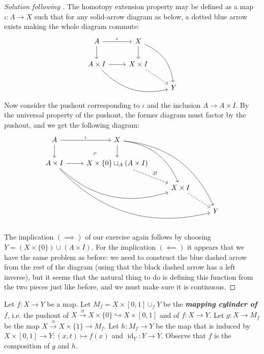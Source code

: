\documentclass{article}
\numberwithin{equation}{section}
\DeclareMathOperator{\id}{id}
\begin{document}
\begin{proof}[Solution following \cite{lectures}]
	The homotopy extension property may be defined as a map $\iota:A\to X$ such that for any solid-arrow diagram as below, a dotted blue arrow exists making the whole diagram commute:
	\[\begin{tikzcd}
		A\arrow[r,"\iota"]\arrow[d]&X\arrow[d]\arrow[ddr,bend left]\\
		A\times I\arrow[r]\arrow[drr,bend right]&X\times I\arrow[dr,dashed,blue]&\\
		&&Y
	\end{tikzcd}\]
	Now consider the pushout corresponding to $\iota$ and the inclusion $A\to A\times I$. By the universal property of the pushout, the former diagram must factor by the pushout, and we get the following diagram:
	\[\begin{tikzcd}
		A\arrow[r,"\iota"]\arrow[d]&X\arrow[d]\arrow[ddr,bend left]\arrow[dddrr, bend left]\\
		A\times I\arrow[r]\arrow[ddrrr,bend right]\arrow[drr,bend right]&X\times\{0\}\sqcup_A(A\times I) \arrow[dr,dashed,"\exists!"]\arrow[ul,phantom,very near start,"\ulcorner"]&\\
		&&X\times I\arrow[dr,dashed,blue]\\
		&&&Y
	\end{tikzcd}\]
	The implication $(\implies)$ of our exercise again follows by choosing $Y=(X\times\{0\})\cup(A\times I)$. For the implication $(\impliedby)$ {\color{red}it appears that we have the same problem as before}: we need to construct the blue dashed arrow from the rest of the diagram (using that the black dashed arrow has a left inverse), but it seems that the natural thing to do is defining this function from the two pieces just like before, and we must make sure it is continuous.
\end{proof}
	\begin{defn}
		Let $f:X\to Y$ be a map. Let $M_f=X\times[0,1]\cup_fY$ be the \textbf{\textit{mapping cylinder of $f$}}, i.e. the pushout of $X\overset{\cong}{\to}X\times\{0\}\hookrightarrow X\times[0,1]$ and of $f:X\to Y$.
	Let $g:X\to M_f$ be the map $X\overset{\cong}{\to}X\times\{1\}\to M_f$. Let $h:M_f\to Y$ be the map that is induced by $X\times[0,1]\to Y:(x,t)\mapsto f(x)$ and $\id_Y:Y\to Y$. Observe that $f$ is the composition of $g$ and $h$.
	\end{defn}
	
\end{document}
